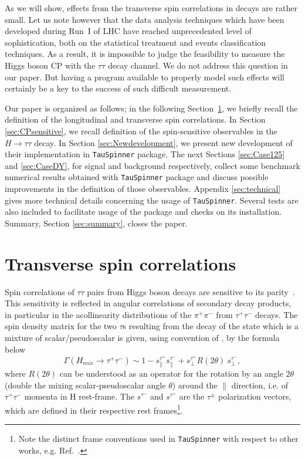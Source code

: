 \documentclass[12pt]{article}
\begin{document}
As we will show, effects from the transverse spin correlations in decays are rather small. 
Let us note however that the data analysis techniques which have been developed during Run~I of LHC
have reached unprecedented level of sophistication, both on the statistical treatment and events 
classification techniques. As a result, it is  impossible to judge the feasibility  to measure the 
Higgs boson CP with the $\tau\tau$ decay channel. We do not address this question in our paper.
But having a program available  to properly model such effects  will certainly be a key to the success 
of such difficult measurement.    

Our paper is organized as follows; in the following Section~\ref{sec:transverse},
we briefly recall the definition of the longitudinal and transverse spin correlations.
In  Section \ref{sec:CPsensitive},  we recall definition of the 
spin-sensitive observables in the $H \to \tau \tau$ decay.  In  Section \ref{sec:Newdevelopment}, we 
present new development of their implementation in  {\tt TauSpinner} package. The next 
Sections \ref{sec:Case125} and \ref{sec:CaseDY}, for signal and background respectively,
 collect some benchmark numerical results obtained with {\tt TauSpinner}
package and discuss possible improvements in the definition of those observables. 
Appendix \ref{sec:technical}  gives more technical details concerning the usage of  {\tt TauSpinner}. 
Several tests are also included to facilitate usage of the package and checks on its installation. 
Summary, Section \ref{sec:summary}, closes the paper.




\section {Transverse spin correlations }
\label{sec:transverse}

Spin correlations of $\tau \tau$ pairs from Higgs boson decays are sensitive to its parity~\cite{Nelson89}.
This sensitivity is reflected in angular correlations of secondary decay products, in particular in 
the acollinearity distributions of the $\pi^+ \pi^-$ from $\tau^+\tau^-$ decays. 
The spin density matrix for the two $\tau$s resulting from the decay of the state which is a mixture 
of scalar/pseudoscalar is given, using convention of \cite{Kramer:1994jn}, by the formula below
\begin{equation}  
\Gamma(H_{mix}\to \tau^{+}\tau^{-}) \sim 1-s^{\tau^{+}}_{\parallel}
s^{\tau^{-}}_{\parallel}+ s^{\tau^{+}}_{\perp}
R(2\theta)~s^{\tau^{-}}_{\perp},
\label{densi}  
\end{equation}   
where $R(2\theta)$ can be understood as  an operator for the rotation by
an angle $2\theta$ (double the mixing scalar-pseudoscalar angle $\theta$)   
around the ${\parallel}$ direction, i.e. of $\tau^+ \tau^-$ momenta in H rest-frame.  
The $s^{\tau^{-}}$ and $s^{\tau^{+}}$ are  the $\tau^\pm$ polarization
vectors, which are defined  in their respective rest frames\footnote{
Note the distinct frame conventions used in {\tt TauSpinner} with respect
to other works, e.g. Ref.~\cite{Desch:2003rw}.}.
\end{document}
